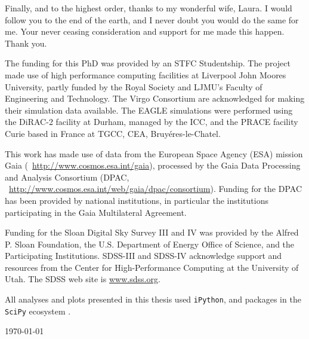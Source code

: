 Finally, and to the highest order, thanks to my wonderful wife, Laura. I would follow you to the end of the earth, and I never doubt you would do the same for me. Your never ceasing consideration and support for me made this happen. Thank you.

\newpage

The funding for this PhD was provided by an STFC Studentship. The project made use of high performance computing facilities at Liverpool John Moores University, partly funded by the Royal Society and LJMU’s Faculty of Engineering and Technology. The Virgo Consortium are acknowledged for making their simulation data available. The EAGLE simulations were performed using the DiRAC-2 facility at Durham, managed by the ICC, and the PRACE facility Curie based in France at TGCC, CEA, Bruy\'eres-le-Chatel.

This work has made use of data from the European Space Agency (ESA)
mission Gaia (~\url{http://www.cosmos.esa.int/gaia}), processed by
the Gaia Data Processing and Analysis Consortium (DPAC,
~\url{http://www.cosmos.esa.int/web/gaia/dpac/consortium}). Funding
for the DPAC has been provided by national institutions, in particular
the institutions participating in the Gaia Multilateral Agreement.

Funding for the Sloan Digital Sky Survey III and IV was provided by the Alfred P. Sloan Foundation, the U.S. Department of Energy Office of Science, and the Participating Institutions. SDSS-III and SDSS-IV acknowledge
support and resources from the Center for High-Performance Computing at
the University of Utah. The SDSS web site is \url{www.sdss.org}.

All analyses and plots presented in this thesis used \texttt{iPython}, and packages in the \texttt{SciPy} ecosystem \citep{Jones:2001aa,4160265,4160251,5725236}.


\vfill
{\sc \AuthorName \hfill\today}